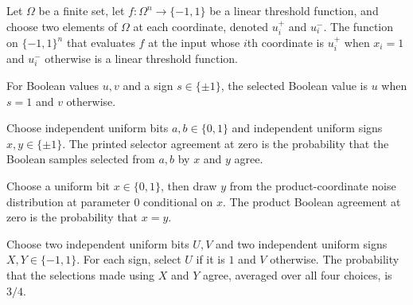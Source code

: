 \begin{theorem}
\label{FABL.isLinearThreshold_selectProductInput}
\leanok
{}
Let $\Omega$ be a finite set, let $f:\Omega^n\to\{-1,1\}$ be a linear threshold
function, and choose two elements of $\Omega$ at each coordinate, denoted $u_i^+$ and
$u_i^-$. The function on $\{-1,1\}^n$ that evaluates $f$ at the input whose $i$th
coordinate is $u_i^+$ when $x_i=1$ and $u_i^-$ otherwise is a linear threshold function.
\end{theorem}

\begin{definition}
\label{FABL.boolSampleSelectedBySign}
\leanok
{}
For Boolean values $u,v$ and a sign $s\in\{\pm1\}$, the selected Boolean value is $u$
when $s=1$ and $v$ otherwise.
\end{definition}

\begin{definition}
\label{FABL.printedSelectorAgreementAtZero}
\leanok
{}
Choose independent uniform bits $a,b\in\{0,1\}$ and independent uniform signs
$x,y\in\{\pm1\}$. The printed selector agreement at zero is the probability that the
Boolean samples selected from $a,b$ by $x$ and $y$ agree.
\end{definition}

\begin{definition}
\label{FABL.productBoolAgreementAtZero}
\leanok
{}
Choose a uniform bit $x\in\{0,1\}$, then draw $y$ from the product-coordinate noise
distribution at parameter $0$ conditional on $x$. The product Boolean agreement at zero
is the probability that $x=y$.
\end{definition}

\begin{theorem}
\label{FABL.printedSelectorAgreementAtZero_eq_three_fourths}
\leanok
{}
Choose two independent uniform bits $U,V$ and two independent uniform signs
$X,Y\in\{-1,1\}$. For each sign, select $U$ if it is $1$ and $V$ otherwise. The
probability that the selections made using $X$ and $Y$ agree, averaged over all four
choices, is $3/4$.
\end{theorem}

